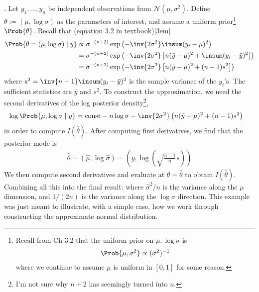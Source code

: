 \documentclass[11pt]{article}
\newcommand\myspace[1][]{\vspace{#1\bigskipamount}}
\newcommand\p{\Needspace{10\baselineskip} \noindent}
\begin{document}
\myspace{}
\p {}. Let $y_1, \ldots, y_n$ be independent observations from $\mathcal{N}(\mu, \sigma^2)$. Define $\theta := (\mu, \log\sigma)$ as the parameters of interest, and assume a uniform prior\footnote{Recall from Ch 3.2 that the uniform prior on $\mu, \log\sigma$ is
\begin{align}
	\Prob{\mu, \sigma^2} \propto (\sigma^2)^{-1}
\end{align}
where we continue to assume $\mu$ is uniform in $[0, 1]$ for some reason.
} $\Prob{\theta}$. Recall that (equation 3.2 in textbook)[3em]
\begin{align}
	\Prob{\theta = (\mu, \log\sigma) \mid y} 
	&\propto \sigma^{-(n+2)} \exp\left(  - \inv{2\sigma^2} \insum (y_i - \mu)^2  \right) \\
	&= \sigma^{-(n+2)} \exp\left(  - \inv{2\sigma^2} \left[n(\bar{y} - \mu)^2 + \insum (y_i - \bar{y})^2 \right] \right) \\
	&= \sigma^{-(n+2)} \exp\left(  - \inv{2\sigma^2} \left[n(\bar{y} - \mu)^2 + (n - 1) s^2 \right] \right)
\end{align}
where $s^2 = \inv{n-1}\insum (y_i - \bar{y})^2$ is the sample variance of the $y_i$'s. The sufficient statistics are $\bar{y}$ and $s^2$. To construct the approximation, we need the second derivatives of the log posterior density\footnote{I'm not sure why $n+2$ has seemingly turned into $n$.},
\begin{align}
	\log \Prob{\mu, \log\sigma \mid y} &= \text{const} - n\log\sigma - \inv{2\sigma^2}\left(  n(\bar{y} - \mu)^2 + (n - 1) s^2  \right)
\end{align}
in order to compute $I(\hat{\theta})$. After computing first derivatives, we find that the posterior mode is
\begin{align}
	\hat{\theta} = (\hat{\mu}, \log\hat{\sigma}) = \left( \bar{y}, \log\left( \sqrt{ \frac{n-1}{n}  }s  \right)  \right)
\end{align}
We then compute second derivatives and evaluate at $\theta = \hat{\theta}$ to obtain $I(\hat{\theta})$. Combining all this into the final result:
where $\hat{\sigma}^2/n$ is the variance along the $\mu$ dimension, and $1/(2n)$ is the variance along the $\log\sigma$ direction. This example was just meant to illustrate, with a simple case, how we work through constructing the approximate normal distribution.
\end{document}
